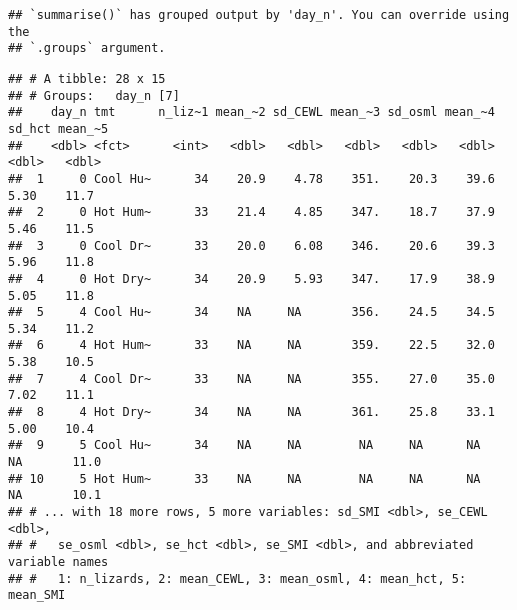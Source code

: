 \documentclass[
]{article}
\newenvironment{Shaded}{\begin{snugshade}}{\end{snugshade}}
\newcommand{\CommentTok}[1]{\textcolor[rgb]{0.56,0.35,0.01}{\textit{#1}}}
\newcommand{\ConstantTok}[1]{\textcolor[rgb]{0.00,0.00,0.00}{#1}}
\newcommand{\FunctionTok}[1]{\textcolor[rgb]{0.00,0.00,0.00}{#1}}
\newcommand{\NormalTok}[1]{#1}
\newcommand{\OtherTok}[1]{\textcolor[rgb]{0.56,0.35,0.01}{#1}}
\newcommand{\SpecialCharTok}[1]{\textcolor[rgb]{0.00,0.00,0.00}{#1}}
\begin{document}
\begin{verbatim}
## `summarise()` has grouped output by 'day_n'. You can override using the
## `.groups` argument.
\end{verbatim}

\begin{Shaded}
\end{Shaded}

\begin{verbatim}
## # A tibble: 28 x 15
## # Groups:   day_n [7]
##    day_n tmt      n_liz~1 mean_~2 sd_CEWL mean_~3 sd_osml mean_~4 sd_hct mean_~5
##    <dbl> <fct>      <int>   <dbl>   <dbl>   <dbl>   <dbl>   <dbl>  <dbl>   <dbl>
##  1     0 Cool Hu~      34    20.9    4.78    351.    20.3    39.6   5.30    11.7
##  2     0 Hot Hum~      33    21.4    4.85    347.    18.7    37.9   5.46    11.5
##  3     0 Cool Dr~      33    20.0    6.08    346.    20.6    39.3   5.96    11.8
##  4     0 Hot Dry~      34    20.9    5.93    347.    17.9    38.9   5.05    11.8
##  5     4 Cool Hu~      34    NA     NA       356.    24.5    34.5   5.34    11.2
##  6     4 Hot Hum~      33    NA     NA       359.    22.5    32.0   5.38    10.5
##  7     4 Cool Dr~      33    NA     NA       355.    27.0    35.0   7.02    11.1
##  8     4 Hot Dry~      34    NA     NA       361.    25.8    33.1   5.00    10.4
##  9     5 Cool Hu~      34    NA     NA        NA     NA      NA    NA       11.0
## 10     5 Hot Hum~      33    NA     NA        NA     NA      NA    NA       10.1
## # ... with 18 more rows, 5 more variables: sd_SMI <dbl>, se_CEWL <dbl>,
## #   se_osml <dbl>, se_hct <dbl>, se_SMI <dbl>, and abbreviated variable names
## #   1: n_lizards, 2: mean_CEWL, 3: mean_osml, 4: mean_hct, 5: mean_SMI
\end{verbatim}
\end{document}

